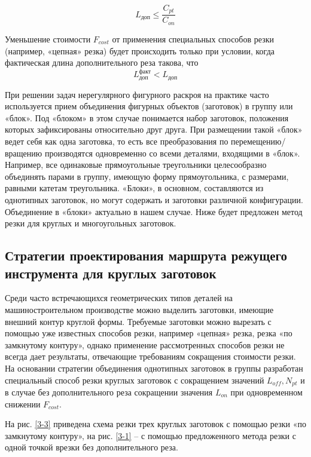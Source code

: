 \documentclass[12pt]{report}
\begin{document}
\begin{equation}
  L_\text{доп} \leqslant \frac{C_{pt}}{C_{on}}
  \label{l-dop}
\end{equation}

Уменьшение стоимости
$F_{cost}$
от применения специальных способов резки
(например, «цепная» резка)
будет происходить только при условии,
когда фактическая длина дополнительного реза
такова, что
\begin{equation}
  L_\text{доп}^\text{факт} < L_\text{доп}
  \label{l-fact-dop}
\end{equation}

При решении задач нерегулярного фигурного раскроя
на практике часто используется прием объединения
фигурных объектов (заготовок)
в группу или «блок».
Под «блоком» в этом случае понимается набор заготовок,
положения которых зафиксированы относительно друг друга.
При размещении такой «блок» ведет себя как одна заготовка,
то есть все преобразования по перемещению/вращению производятся
одновременно со всеми деталями, входящими в «блок».
Например, все одинаковые прямоугольные треугольники
целесообразно объединять парами в группу, имеющую форму прямоугольника,
с размерами, равными катетам треугольника.
«Блоки», в основном, составляются из однотипных заготовок,
но могут содержать и заготовки различной конфигурации.
Объединение в «блоки» актуально в нашем случае.
Ниже будет предложен метод резки для круглых и многоугольных заготовок.

\subsection{Стратегии проектирования маршрута режущего инструмента для круглых заготовок}

Среди часто встречающихся геометрических типов деталей
на машиностроительном производстве можно выделить заготовки,
имеющие внешний контур круглой формы.
Требуемые заготовки можно вырезать с
помощью уже известных способов резки,
например «цепная» резка, резка «по замкнутому контуру»,
однако применение рассмотренных способов резки не всегда
дает результаты, отвечающие требованиям сокращения стоимости резки.
На основании стратегии объединения однотипных заготовок
в группы разработан специальный способ резки круглых
заготовок с сокращением значений
$L_{off}, N_{pt}$
и в случае без дополнительного реза сокращении значения
$L_{on}$
при одновременном снижении
$F_{cost}$.

На рис. \ref{3-3}
приведена схема резки трех круглых заготовок
с помощью резки «по замкнутому контуру»,
на рис. \ref{3-1}
– с помощью предложенного метода резки
с одной точкой врезки без дополнительного реза.
\end{document}
